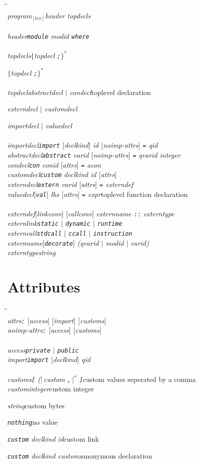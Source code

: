 \documentclass[a4paper,dvips]{article}
\newcommand{\ttlcurly}{\char123}
\newcommand{\ttrcurly}{\char125}
\newenvironment{productions}%
  {\begin{tabbing}\hspace{2cm}\=\hspace{6cm}\=\kill{}\\}%
  {\end{tabbing}}
\newcommand{\fixed}[1]{\makebox[3.5em]{#1}}
\newcommand{\production}[3]{\nont{#1}\>\fixed{$\rightarrow$}\nont{#2}\>#3\\}
\newcommand{\next}[2]{\strut{}\>\fixed{$|$}\nont{#1}\>#2\\}
\newcommand{\nont}[1]{\textit{#1}}
\newcommand{\pspace}{\hspace{0.25ex}}
\newcommand{\opt}[1]{$[$#1$]$}
\newcommand{\many}[1]{$\{$#1\pspace$\}^*$}
\newcommand{\bananas}[2]{{\rm (}\hspace{-0.5ex}$|\,$#1\pspace$\,|$\hspace{-0.5ex}{\rm )}$^{#2}$}
\newcommand{\sepby}[2]{\bananas{#1 #2}{*}}
\newcommand{\termby}[2]{\many{#1 #2}}
\newcommand{\term}[1]{{\tt #1}}
\newcommand{\por}{$|$}
\newcommand{\pgroup}[1]{{\rm(}#1{\rm{})}}
\newcommand{\lex}[2]{\nont{#2}$_{[\nont{#1}]}$}
\begin{document}
\begin{productions}
\production{\lex{lex}{program}}{header topdecls}{}
\\
\production{header}{\term{module} modid \term{where}}{}
\\
\production{topdecls}{\termby{topdecl}{\term{;}} }{}
\next{\term{\ttlcurly} \termby{topdecl}{\term{;}} \term{\ttrcurly} }{}
\\
\production{topdecl}{abstractdecl \por{} condecl}{toplevel declaration}
\next{externdecl \por{} customdecl}{}
\next{importdecl \por{} valuedecl}{}
\\
\production{importdecl}{\term{import} \opt{declkind} id \opt{noimp-attrs} \term{=} qid}{}
\production{abstractdecl}{\term{abstract} varid \opt{noimp-attrs} \term{=} qvarid integer}{}
\production{condecl}{\term{con} conid \opt{attrs} \term{=} acon}{}
\production{customdecl}{\term{custom} \nont{declkind} \nont{id} \opt{\nont{attrs}}}{}
\production{externdecl}{\term{extern} varid \opt{attrs} \term{=} externdef}{}
\production{valuedecl}{\opt{\term{val}} lhs \opt{attrs} \term{=} expr}{toplevel function declaration}
\\
\production{externdef}{\opt{linkconv} \opt{callconv} externname \term{::} externtype}{}
\production{externlink}{\term{static} \por{} \term{dynamic} \por{} \term{runtime}}{}
\production{externcall}{\term{stdcall} \por{} \term{ccall} \por{} \term{instruction}}{}
\production{externname}{\opt{\term{decorate}} \pgroup{qvarid \por{} modid \por{} varid}}{}
\production{externtype}{string}{}
\end{productions}



\section{Attributes}

\begin{productions}
\production{attrs}{\term{:} \opt{access} \opt{import} \opt{customs}}{}
\production{noimp-attrs}{\term{:} \opt{access} \opt{customs}}{}
\\
\production{access}{\term{private} \por{} \term{public}}{}
\production{import}{\term{import} \opt{declkind} qid}{}
\\
\production{customs}{\term{[} \sepby{custom}{\term{,}} \term{]}}{custom values seperated by a comma}
\production{custom}{\nont{integer}}{custom integer}
\next{\nont{string}}{custom bytes}
\next{\term{nothing}}{no value}
\next{\term{custom} \nont{declkind} \nont{id}}{custom link}
\next{\term{custom} \nont{declkind} \nont{customs}}{anonymous declaration}
\end{productions}
\end{document}
